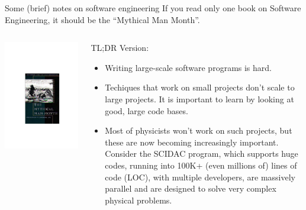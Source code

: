 \documentclass[aspectratio=169]{beamer}
\begin{document}
\begin{frame}{Some (brief) notes on software engineering}
  \footnotesize%
  If you read only one book on Software Engineering, it
  should be the ``Mythical Man Month''.

  \begin{columns}
    \begin{column}{0.4\linewidth}
      \includegraphics[width=0.8\linewidth]{mmm.pdf}
    \end{column}
    
    \begin{column}{0.6\linewidth}
      TL;DR Version: 
      \begin{itemize}
      \item Writing large-scale software programs is hard. 
      \item Techiques that work on small projects don't scale to large
        projects. It is important to learn by looking at good, large
        code bases.
      \item Most of physicists won't work on such projects, but these
        are now becoming increasingly important. Consider the SCIDAC
        program, which supports huge codes, running into 100K+ (even
        millions of) lines of code (LOC), with multiple developers,
        are massively parallel and are designed to solve very complex
        physical problems.
      \end{itemize}
    \end{column}
  \end{columns}
    
\end{frame}
\end{document}
